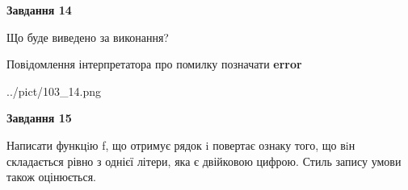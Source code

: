 \documentclass[11pt, ukrainian]{article}
\begin{document}
{\begin {large}
{\begin {center}\textbf{Завдання 14}\end {center}}\par
Що буде виведено за виконання? \par
Повідомлення інтерпретатора про помилку позначати \textbf{error}

\begin{center}
	{../pict/103_14.png}
\end{center}
\newpage

{\begin {center}\textbf{Завдання 15}\end {center}}\par

Написати функцiю f, що отримує рядок i повертає ознаку того, що вiн складається рівно з однієї літери, яка є двійковою цифрою. Стиль запису умови також оцінюється.\par
\newpage

\end {large}}
\end{document}

